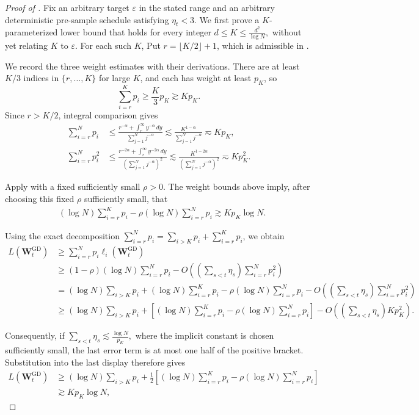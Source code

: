 \documentclass[11pt]{article}
\theoremstyle{definition}
\newcommand{\Wb}{\mathbf{W}}
\newcommand{\eps}{\varepsilon}
\begin{document}
\begin{proof}[Proof of ]
Fix an arbitrary target $\eps$ in the stated range and an arbitrary deterministic pre-sample schedule satisfying $\eta_t<3.$ We first prove a $K$-parameterized lower bound that holds for every integer $d\leq K\leq\frac{d^2}{\log N},$ without yet relating $K$ to $\eps$. For each such $K$,  Put $r=\lfloor K/2\rfloor+1$, which is admissible in .

We record the three weight estimates with their derivations.  There are at
least $K/3$ indices in $\{r,\ldots,K\}$ for large $K$, and each has weight
at least $p_K$, so
\[
 \sum_{i=r}^Kp_i\geq\frac K3p_K\gtrsim Kp_K.
\]
Since $r>K/2$, integral comparison gives
\begin{align*}
 \sum_{i=r}^Np_i
 &\leq
 \frac{r^{-\alpha}+\int_r^\infty y^{-\alpha}\,dy}
 {\sum_{j=1}^Nj^{-\alpha}}\lesssim\frac{K^{1-\alpha}}{\sum_{j=1}^Nj^{-\alpha}}
 \eqsim Kp_K,\\
 \sum_{i=r}^Np_i^2
 &\leq
 \frac{r^{-2\alpha}+\int_r^\infty y^{-2\alpha}\,dy}
 {(\sum_{j=1}^Nj^{-\alpha})^2}\lesssim\frac{K^{1-2\alpha}}
 {(\sum_{j=1}^Nj^{-\alpha})^2}
 \eqsim Kp_K^2.
\end{align*}

Apply  with a fixed sufficiently small $\rho>0$.
The weight bounds above imply, after choosing this fixed $\rho$ sufficiently
small, that
\begin{align*}
 &(\log N)\sum_{i=r}^Kp_i
 -\rho(\log N)\sum_{i=r}^Np_i \gtrsim Kp_K\log N.
\end{align*}

Using the exact decomposition
$\sum_{i=r}^Np_i=\sum_{i>K}p_i+\sum_{i=r}^Kp_i$, we obtain
\begin{align*}
 L(\Wb_t^{\mathrm{GD}})
 &\geq\sum_{i=r}^Np_i\ell_i(\Wb_t^{\mathrm{GD}})\\
 &\geq(1-\rho)(\log N)\sum_{i=r}^Np_i
 -O\!\left(
  \left(\sum_{s<t}\eta_s\right)
  \sum_{i=r}^Np_i^2
 \right)\\
 &= (\log N)\sum_{i>K}p_i
 +(\log N)\sum_{i=r}^Kp_i
 -\rho(\log N)\sum_{i=r}^Np_i-O\!\left(
  \left(\sum_{s<t}\eta_s\right)
  \sum_{i=r}^Np_i^2
 \right)\\
 &\geq(\log N)\sum_{i>K}p_i
 +\left[
  (\log N)\sum_{i=r}^Kp_i
  -\rho(\log N)\sum_{i=r}^Np_i
 \right]-
 O\!\left(
  \left(\sum_{s<t}\eta_s\right)Kp_K^2
 \right).
\end{align*}

Consequently, if
$ \sum_{s<t}\eta_s
 \lesssim\frac{\log N}{p_K},
$
where the implicit constant is chosen sufficiently small, the
last error term is at most one half of the positive bracket.  Substitution
into the last display therefore gives
\begin{align*}
 L(\Wb_t^{\mathrm{GD}})
 &\geq(\log N)\sum_{i>K}p_i
 +\frac12\left[
  (\log N)\sum_{i=r}^Kp_i
  -\rho(\log N)\sum_{i=r}^Np_i
 \right]\\
 &\gtrsim Kp_K\log N,
\end{align*}


\end{proof}
\end{document}

